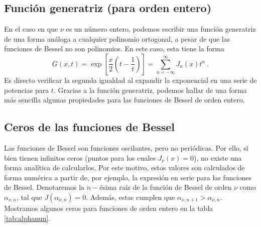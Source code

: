 


\subsection{Función generatriz (para orden entero)}

En el caso en que $\nu$ es un número entero, podemos escribir una función generatriz de una forma análoga a cualquier polinomio ortogonal, a pesar de que las funciones de Bessel no son polinomios. En este caso, esta tiene la forma
\begin{equation}
    G(x,t) = \exp\left[ \frac{x}{2} \left( t - \frac{1}{t} \right) \right] = \sum_{n = -\infty}^\infty J_n(x) t^n \ .
\end{equation}
Es directo verificar la segunda igualdad al expandir la exponencial en una serie de potencias para $t$. Gracias a la función generatriz, podemos hallar de una forma más sencilla algunas propiedades para las funciones de Bessel de orden entero.

\subsection{Ceros de las funciones de Bessel}

Las funciones de Bessel son funciones oscilantes, pero no periódicas. Por ello, si bien tienen infinitos ceros (puntos para los cuales $J_\nu(x) = 0$), no existe una forma analítica de calcularlos. Por este motivo, estos valores son calculados de forma numérica a partir de, por ejemplo, la expresión en serie para las funciones de Bessel. Denotaremos la $n-$ésima raíz de la función de Bessel de orden $\nu$ como $\alpha_{\nu, n}$, tal que $J(\alpha_{\nu, n}) = 0$. Además, estas cumplen que $\alpha_{\nu, n+1} > \alpha_{\nu, n}$. Mostramos algunos ceros para funciones de orden entero en la tabla \ref{tab:alphanun}.

